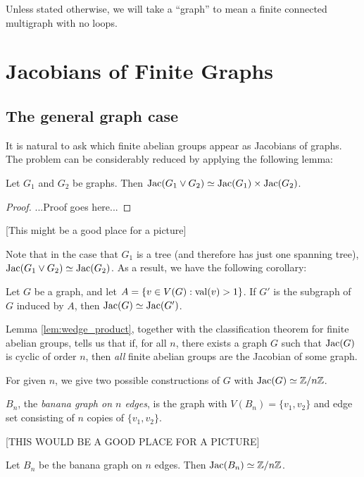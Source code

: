 \documentclass{amsart}
\begin{document}
Unless stated otherwise, we will take a ``graph'' to mean a finite
connected multigraph with no loops.


\section{Jacobians of Finite Graphs}

\subsection{The general graph case}
It is natural to ask which finite abelian groups appear as Jacobians
of graphs. The problem can be considerably reduced by applying the
following lemma:

\begin{lem}
\label{lem:wedge_product}
Let $G_1$ and $G_2$ be graphs. Then $\operatorname{Jac}(G_1 \vee G_2) \simeq
\operatorname{Jac}(G_1) \times \operatorname{Jac}(G_2)$.
\end{lem}
\begin{proof}
  ...Proof goes here...
\end{proof}

[This might be a good place for a picture]

Note that in the case that $G_1$ is a tree (and therefore has just one
spanning tree), $\operatorname{Jac}(G_1 \vee G_2) \simeq \operatorname{Jac}(G_2)$. As a result, we
have the following corollary:
\begin{cor}
  \label{cor:1_valent}
  Let $G$ be a graph, and let $A = \{v \in V(G) : \operatorname{val}(v) > 1\}$. If
  $G'$ is the subgraph of $G$ induced by $A$, then $\operatorname{Jac}(G) \simeq
  \operatorname{Jac}(G')$.
\end{cor}

Lemma \ref{lem:wedge_product}, together with the classification
theorem for finite abelian groups, tells us that if, for all $n$,
there exists a graph $G$ such that $\operatorname{Jac}(G)$ is cyclic of order $n$,
then \emph{all} finite abelian groups are the Jacobian of some graph.

For given $n$, we give two possible constructions of $G$ with $\operatorname{Jac}(G)
\simeq \mathbb{Z}/n\mathbb{Z}$.

\begin{defn}
  $B_n$, the \emph{banana graph on $n$ edges}, is the graph with
  $V(B_n) = \{v_1, v_2\}$ and edge set consisting of $n$ copies of
  $\{v_1, v_2\}$.
\end{defn}

[THIS WOULD BE A GOOD PLACE FOR A PICTURE]

\begin{prop}
  \label{prop:banana_cyclic}
  Let $B_n$ be the banana graph on $n$ edges. Then $\operatorname{Jac}(B_n) \simeq \mathbb{Z}/n\mathbb{Z}$.
\end{prop}
\end{document}
